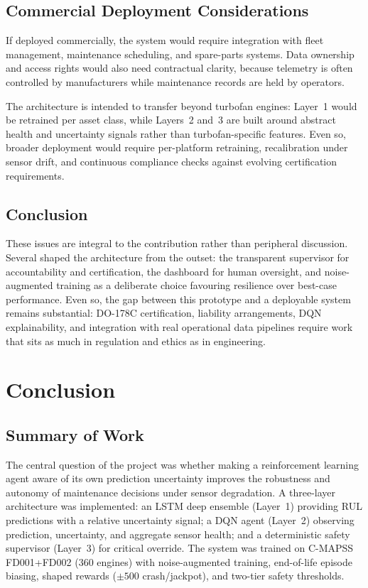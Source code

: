 \documentclass[12pt,a4paper]{report}
\begin{document}
\section{Commercial Deployment Considerations}

If deployed commercially, the system would require integration with fleet management, maintenance scheduling, and spare-parts systems. Data ownership and access rights would also need contractual clarity, because telemetry is often controlled by manufacturers while maintenance records are held by operators.

The architecture is intended to transfer beyond turbofan engines: Layer~1 would be retrained per asset class, while Layers~2 and~3 are built around abstract health and uncertainty signals rather than turbofan-specific features. Even so, broader deployment would require per-platform retraining, recalibration under sensor drift, and continuous compliance checks against evolving certification requirements.

\section{Conclusion}

These issues are integral to the contribution rather than peripheral discussion. Several shaped the architecture from the outset: the transparent supervisor for accountability and certification, the dashboard for human oversight, and noise-augmented training as a deliberate choice favouring resilience over best-case performance. Even so, the gap between this prototype and a deployable system remains substantial: DO-178C certification, liability arrangements, DQN explainability, and integration with real operational data pipelines require work that sits as much in regulation and ethics as in engineering.



\chapter{Conclusion}

\section{Summary of Work}

The central question of the project was whether making a reinforcement learning agent aware of its own prediction uncertainty improves the robustness and autonomy of maintenance decisions under sensor degradation. A three-layer architecture was implemented: an LSTM deep ensemble (Layer~1) providing RUL predictions with a relative uncertainty signal; a DQN agent (Layer~2) observing prediction, uncertainty, and aggregate sensor health; and a deterministic safety supervisor (Layer~3) for critical override. The system was trained on C-MAPSS FD001+FD002 (360 engines) with noise-augmented training, end-of-life episode biasing, shaped rewards ($\pm 500$ crash/jackpot), and two-tier safety thresholds.
\end{document}

